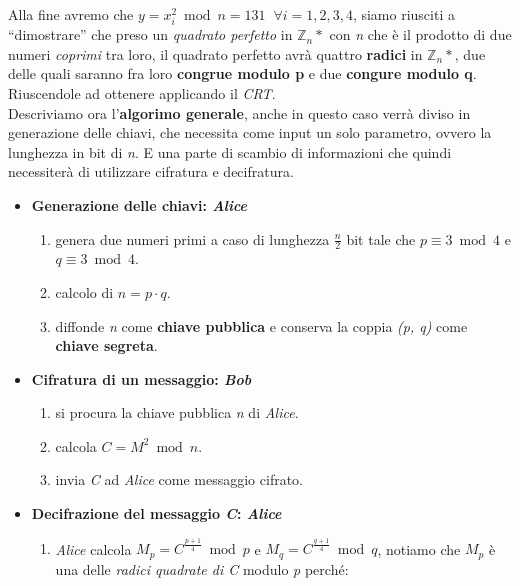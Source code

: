 Alla fine avremo che $y = x_i^2 \bmod n = 131\;\; \forall i = 1, 2, 3, 4$, siamo riusciti a ``dimostrare'' che preso un \textit{quadrato perfetto} in $\mathbb{Z}_n*$ con \textit{n} che è il prodotto di due numeri \textit{coprimi} tra loro, il quadrato perfetto avrà quattro \textbf{radici} in $\mathbb{Z}_n*$, due delle quali saranno fra loro \textbf{congrue modulo p} e due \textbf{congure modulo q}. Riuscendole ad ottenere applicando il \textit{CRT}.
\\ \newline
Descriviamo ora l'\textbf{algorimo generale}, anche in questo caso verrà diviso in generazione delle chiavi, che necessita come input un solo parametro, ovvero la lunghezza in bit di \textit{n}. E una parte di scambio di informazioni che quindi necessiterà di utilizzare cifratura e decifratura.
\begin{itemize}
    \item \textbf{Generazione delle chiavi: \textit{Alice}}
    \begin{enumerate}
        \item genera due numeri primi a caso di lunghezza $\frac{n}{2}$ bit tale che $p \equiv 3 \bmod 4$ e $q \equiv 3 \bmod 4$.
        \item calcolo di $n = p \cdot q$.
        \item diffonde \textit{n} come \textbf{chiave pubblica} e conserva la coppia \textit{(p, q)} come \textbf{chiave segreta}.
    \end{enumerate}
    \item \textbf{Cifratura di un messaggio: \textit{Bob}}
    \begin{enumerate}
        \item si procura la chiave pubblica \textit{n} di \textit{Alice}.
        \item calcola $C = M^2 \bmod n$.
        \item invia \textit{C} ad \textit{Alice} come messaggio cifrato.
    \end{enumerate}
    \item \textbf{Decifrazione del messaggio \textit{C}: \textit{Alice}}
    \begin{enumerate}
        \item \textit{Alice} calcola $M_p = C^{\frac{p + 1}{4}} \bmod p$ e $M_q = C^{\frac{q + 1}{4}} \bmod q$, notiamo che $M_p$ è una delle \textit{radici quadrate di C} modulo \textit{p} perché:
        \begin{center}
            \begin{math}

\end{math}
\end{center}
\end{enumerate}
\end{itemize}
